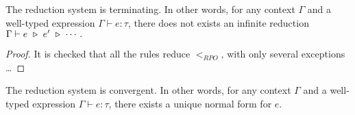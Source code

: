 \begin{lemma}[termination]
  The reduction system is terminating. In other words, for any context $\Gamma$ and a well-typed expression $\Gamma \vdash e : \tau$, there does not exists an infinite reduction $\Gamma \vdash e \ \triangleright\  e' \ \triangleright\ \cdots .$
\end{lemma}
\begin{proof}
  It is checked that all the rules reduce $<_{RPO}$, with only several exceptions \dots {}
\end{proof}


\begin{lemma}[convergence]
  The reduction system is convergent. In other words, for any context $\Gamma$ and a well-typed expression $\Gamma \vdash e : \tau$, there exists a unique normal form for $e$.
\end{lemma}
